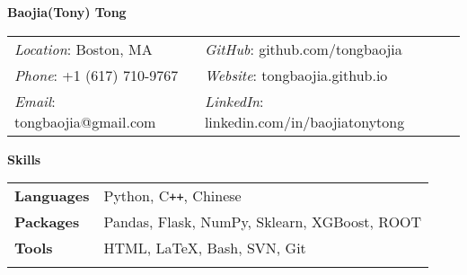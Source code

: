 \documentclass[letterpaper,11pt,oneside]{article}
\newcommand{\crimson}[1]{\textcolor[rgb]{0.67, 0.11, 0.188}{#1}}
\begin{document}
\noindent  \center \LARGE{\textbf{Baojia(Tony)   Tong}}  \\
\vspace{0.5cm}
\normalsize
\begin{center}
\begin{tabular}{l l}
 \textit{Location}: Boston, MA                             
 & \hspace{1.01in} \textit{GitHub}: github.com/tongbaojia \\
 \textit{Phone}: +1 (617) 710-9767	            
 & \hspace{1.01in} \textit{Website}: tongbaojia.github.io   \\
 \textit{Email}: tongbaojia@gmail.com            
 & \hspace{1.01in} \textit{LinkedIn}: linkedin.com/in/baojiatonytong  \\
\end{tabular}
\end{center}

 \raggedright
 \textbf{\Large{\crimson{S}kills}} \sout{\hfill} \\
 \normalsize
 \begin{flushleft}
 \begin{tabular}{@{} l l }
     \textbf{Languages} & Python, C\texttt{++}, Chinese \\
     \textbf{Packages} & Pandas, Flask, NumPy, Sklearn, XGBoost, ROOT \\
     \textbf{Tools} & HTML, \LaTeX, Bash, SVN, Git \\
     \\
      \end{tabular}
\end{flushleft}
\end{document}

